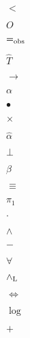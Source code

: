 \documentclass{article}
\begin{document}
$<$
\pagebreak

$O$
\pagebreak

$=_{\rm obs}$
\pagebreak

$\widehat{T}$
\pagebreak

$\to$
\pagebreak

$\alpha$
\pagebreak

$\bullet$
\pagebreak

$\times$
\pagebreak

$\widehat{\alpha}$
\pagebreak

$\bot$
\pagebreak

$\beta$
\pagebreak

$\equiv$
\pagebreak

$\pi_1$
\pagebreak

$\cdot$
\pagebreak

$\land$
\pagebreak

$-$
\pagebreak

$\forall$
\pagebreak

$\land_{\rm L}$
\pagebreak

$\Leftrightarrow$
\pagebreak

$\log$
\pagebreak

$+$
\pagebreak
\end{document}
